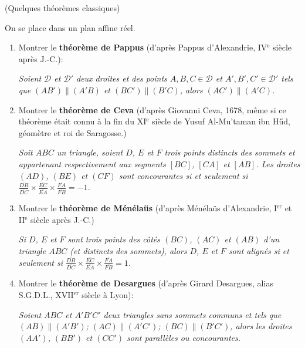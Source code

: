 \documentclass[a4paper,12pt,reqno]{amsart}
\begin{document}
\begin{exo} (Quelques théorèmes classiques)

  On se place dans un plan affine réel.

  \begin{enumerate}
  \item Montrer le \textbf{théorème de Pappus} (d'après Pappus d'Alexandrie, IV$^{\mbox{e}}$ siècle après J.-C.):

  \textit{\og Soient $\mathcal{D}$ et $\mathcal{D}'$ deux droites et des points $A,B,C\in \mathcal{D}$ et $A',B',C'\in \mathcal{D}'$
  tels que $(AB')\parallel(A'B)$ et $(BC')\parallel(B'C)$, alors $(AC')\parallel(A'C)$.\fg}

  \item Montrer le \textbf{théorème de Ceva} (d'après Giovanni Ceva, 1678, même si ce théorème était connu à la fin du XI$^{\mbox{e}}$ siècle de Yusuf Al-Mu'taman ibn H\H{u}d, géomètre et roi de Saragosse.)

  \textit{\og Soit $ABC$ un triangle, soient $D$, $E$ et $F$ trois points distincts des sommets et appartenant respectivement aux segments $[BC]$, $[CA]$ et $[AB]$. Les droites $(AD)$, $(BE)$ et $(CF)$ sont concourantes si et seulement si $\frac{\overline{DB}}{\overline{DC}}\times\frac{\overline{EC}}{\overline{EA}}\times\frac{\overline{FA}}{\overline{FB}}=-1$.\fg}

  \item Montrer le \textbf{théorème de Ménélaüs} (d'après Ménélaüs d'Alexandrie, I$^{\mbox{er}}$ et II$^{\mbox{e}}$ siècle après J.-C.)

  \textit{\og Si $D$, $E$ et $F$ sont trois points des côtés $(BC)$, $(AC)$ et $(AB)$ d'un triangle $ABC$ (et distincts des sommets), alors $D$, $E$ et $F$ sont alignés si et seulement si $\frac{\overline{DB}}{\overline{DC}}\times\frac{\overline{EC}}{\overline{EA}}\times\frac{\overline{FA}}{\overline{FB}}=1$.\fg}

  \item Montrer le \textbf{théorème de Desargues} (d'après Girard Desargues, alias S.G.D.L., XVII$^{\mbox{er}}$ siècle à Lyon):

  \textit{\og Soient $ABC$ et $A'B'C'$ deux triangles sans sommets communs et tels que $(AB)\parallel(A'B')$; $(AC)\parallel(A'C')$; $(BC)\parallel(B'C')$, alors les droites $(AA')$, $(BB')$ et $(CC')$ sont parallèles ou concourantes.\fg}

  \end{enumerate}
\end{exo}
\end{document}
